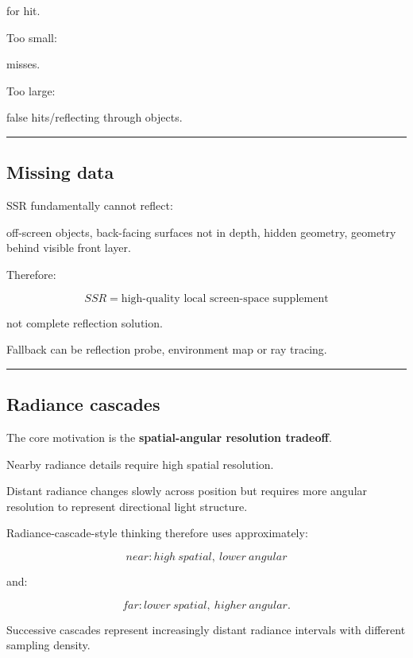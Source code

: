 for hit.

Too small:

misses.

Too large:

false hits/reflecting through objects.

\begin{center}\rule{0.5\linewidth}{0.5pt}\end{center}

\subsection{Missing data}\label{04-visual-computing-ii-ch040-missing-data}

SSR fundamentally cannot reflect:

off-screen objects, back-facing surfaces not in depth, hidden geometry, geometry behind visible front layer.

Therefore:

\[
\boxed{
SSR
=
\text{high-quality local screen-space supplement}
}
\]

not complete reflection solution.

Fallback can be reflection probe, environment map or ray tracing.

\begin{center}\rule{0.5\linewidth}{0.5pt}\end{center}

\subsection{Radiance cascades}\label{04-visual-computing-ii-ch040-radiance-cascades}

The core motivation is the \textbf{spatial-angular resolution tradeoff}.

Nearby radiance details require high spatial resolution.

Distant radiance changes slowly across position but requires more angular resolution to represent directional light structure.

Radiance-cascade-style thinking therefore uses approximately:

\[
\boxed{
near:
high\ spatial,\ lower\ angular
}
\]

and:

\[
\boxed{
far:
lower\ spatial,\ higher\ angular.
}
\]

Successive cascades represent increasingly distant radiance intervals with different sampling density.

